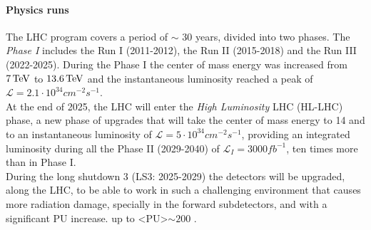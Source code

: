 \paragraph*{Physics runs}
The LHC program covers a period of $\sim$ 30 years, divided into two phases. 
The \emph{Phase I} includes the Run I (2011-2012), the Run II (2015-2018) and the Run III (2022-2025).
During the Phase I the center of mass energy was increased from $7 {\,\text{Te\hspace{-.08em}V}}$ to $13.6 {\,\text{Te\hspace{-.08em}V}}$ and the instantaneous luminosity reached a peak of $\mathcal{L}= 2.1 \cdot 10^{34}cm^{-2} s^{-1}$. \\
At the end of 2025, the LHC will enter the \emph{High Luminosity} LHC (HL-LHC) phase, a new phase of upgrades that will take the center of mass energy to 14 \TeV and to an instantaneous luminosity of $\mathcal{L}=5 \cdot 10^{34}cm^{-2} s^{-1}$, providing an integrated luminosity during all the Phase II (2029-2040) of $\mathcal{L}_I=3000 fb^{-1}$, ten times more than in Phase I.\\
During the long shutdown 3 (LS3: 2025-2029) the detectors will be upgraded, along the LHC, to be able to work in such a challenging environment that causes more radiation damage, specially in the forward subdetectors, and with a significant PU increase. up to <PU>$\sim 200$ \cite{Aberle2020SubmitterReport}. 

